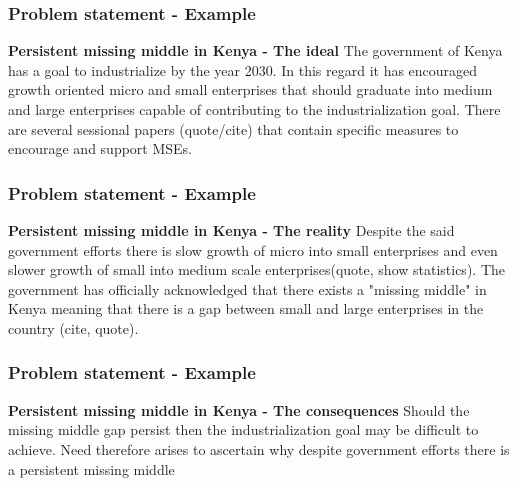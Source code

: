 \documentclass{beamer}
\begin{document}


\begin{frame}
\frametitle{\textbf{Problem statement - Example}}
\begin{block}{\textbf{Persistent missing middle in Kenya - The ideal}}
\Large The government of Kenya has a goal to industrialize by the year 2030. In this regard it has encouraged growth oriented micro and small enterprises that should graduate into medium and large enterprises capable of contributing to the industrialization goal. There are several sessional papers (quote/cite) that contain specific measures to encourage and support MSEs.\\

\end{block}

\end{frame}



\begin{frame}
\frametitle{\textbf{Problem statement - Example}}
\begin{block}{\textbf{Persistent missing middle in Kenya - The reality}}
\Large Despite the said government efforts there is slow growth of micro into small enterprises  and even slower growth of small into medium scale enterprises(quote, show statistics). The government has officially acknowledged that there exists a "missing middle" in Kenya meaning that there is a gap between small and large enterprises in the country (cite, quote).\\

\end{block}

\end{frame}


\begin{frame}
\frametitle{\textbf{Problem statement - Example}}
\begin{block}{\textbf{Persistent missing middle in Kenya - The consequences}}
\Large Should the missing middle gap persist then the industrialization goal may be difficult to achieve. Need therefore arises to ascertain why despite government efforts there is a persistent missing middle\\

\end{block}

\end{frame}
\end{document}
